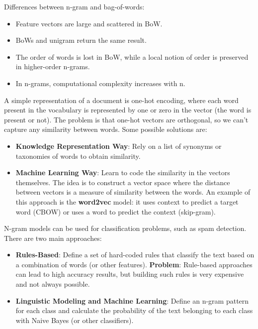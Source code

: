 \documentclass[12pt]{article}
\begin{document}
\begin{enumerate}[label=\textbf{NLP.\arabic*}]
          Differences between n-gram and bag-of-words:
          \begin{itemize}
              \item Feature vectors are large and scattered in BoW.
              \item BoWs and unigram return the same result.
              \item The order of words is lost in BoW, while a local notion of order is preserved in higher-order n-grams.
              \item In n-grams, computational complexity increases with n.
          \end{itemize}
          A simple representation of a document is one-hot encoding, where each word present in the vocabulary is represented by one or zero in the vector (the word is present or not). The problem is that one-hot vectors are orthogonal, so we can't capture any similarity between words. Some possible solutions are:
          \begin{itemize}
              \item \textbf{Knowledge Representation Way}: Rely on a list of synonyms or taxonomies of words to obtain similarity.
              \item \textbf{Machine Learning Way}: Learn to code the similarity in the vectors themselves. The idea is to construct a vector space where the distance between vectors is a measure of similarity between the words. An example of this approach is the \textbf{word2vec} model: it uses context to predict a target word (CBOW) or uses a word to predict the context (skip-gram).
          \end{itemize}

          N-gram models can be used for classification problems, such as spam detection. There are two main approaches:
          \begin{itemize}
              \item \textbf{Rules-Based}: Define a set of hard-coded rules that classify the text based on a combination of words (or other features).
                    \textbf{Problem}: Rule-based approaches can lead to high accuracy results, but building such rules is very expensive and not always possible.
              \item \textbf{Linguistic Modeling and Machine Learning}: Define an n-gram pattern for each class and calculate the probability of the text belonging to each class with Naive Bayes (or other classifiers).
          \end{itemize}

\end{enumerate}
\end{document}
